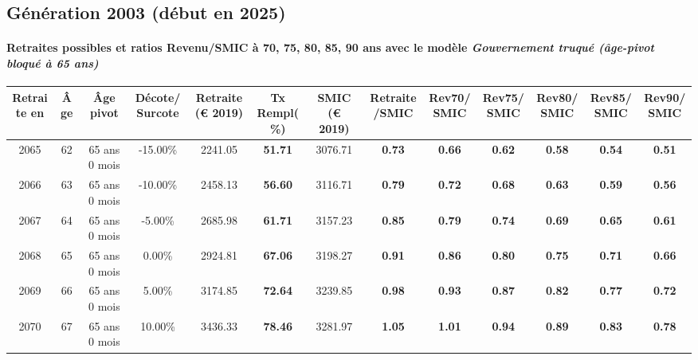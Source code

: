 \newpage 
 
\subsection{Génération 2003 (début en 2025)} 

\paragraph{Retraites possibles et ratios Revenu/SMIC à 70, 75, 80, 85, 90 ans avec le modèle \emph{Gouvernement truqué (âge-pivot bloqué à 65 ans)}}  
 
{ \scriptsize \begin{center} 
\begin{tabular}[htb]{|c|c||c|c||c|c||c||c|c|c|c|c|c|} 
\hline 
 Retraite en &  Âge &  Âge pivot &  Décote/Surcote &  Retraite (\euro{} 2019) &  Tx Rempl(\%) &  SMIC (\euro{} 2019) &  Retraite/SMIC &  Rev70/SMIC &  Rev75/SMIC &  Rev80/SMIC &  Rev85/SMIC &  Rev90/SMIC \\ 
\hline \hline 
 2065 &  62 &  65 ans 0 mois &  -15.00\% &  2241.05 &  {\bf 51.71} &  3076.71 &  {\bf {\color{red} 0.73}} &  {\bf {\color{red} 0.66}} &  {\bf {\color{red} 0.62}} &  {\bf {\color{red} 0.58}} &  {\bf {\color{red} 0.54}} &  {\bf {\color{red} 0.51}} \\ 
\hline 
 2066 &  63 &  65 ans 0 mois &  -10.00\% &  2458.13 &  {\bf 56.60} &  3116.71 &  {\bf {\color{red} 0.79}} &  {\bf {\color{red} 0.72}} &  {\bf {\color{red} 0.68}} &  {\bf {\color{red} 0.63}} &  {\bf {\color{red} 0.59}} &  {\bf {\color{red} 0.56}} \\ 
\hline 
 2067 &  64 &  65 ans 0 mois &  -5.00\% &  2685.98 &  {\bf 61.71} &  3157.23 &  {\bf {\color{red} 0.85}} &  {\bf {\color{red} 0.79}} &  {\bf {\color{red} 0.74}} &  {\bf {\color{red} 0.69}} &  {\bf {\color{red} 0.65}} &  {\bf {\color{red} 0.61}} \\ 
\hline 
 2068 &  65 &  65 ans 0 mois &  0.00\% &  2924.81 &  {\bf 67.06} &  3198.27 &  {\bf {\color{red} 0.91}} &  {\bf {\color{red} 0.86}} &  {\bf {\color{red} 0.80}} &  {\bf {\color{red} 0.75}} &  {\bf {\color{red} 0.71}} &  {\bf {\color{red} 0.66}} \\ 
\hline 
 2069 &  66 &  65 ans 0 mois &  5.00\% &  3174.85 &  {\bf 72.64} &  3239.85 &  {\bf {\color{red} 0.98}} &  {\bf {\color{red} 0.93}} &  {\bf {\color{red} 0.87}} &  {\bf {\color{red} 0.82}} &  {\bf {\color{red} 0.77}} &  {\bf {\color{red} 0.72}} \\ 
\hline 
 2070 &  67 &  65 ans 0 mois &  10.00\% &  3436.33 &  {\bf 78.46} &  3281.97 &  {\bf 1.05} &  {\bf 1.01} &  {\bf {\color{red} 0.94}} &  {\bf {\color{red} 0.89}} &  {\bf {\color{red} 0.83}} &  {\bf {\color{red} 0.78}} \\ 
\hline 
\hline 
\end{tabular} 
\end{center} } 

